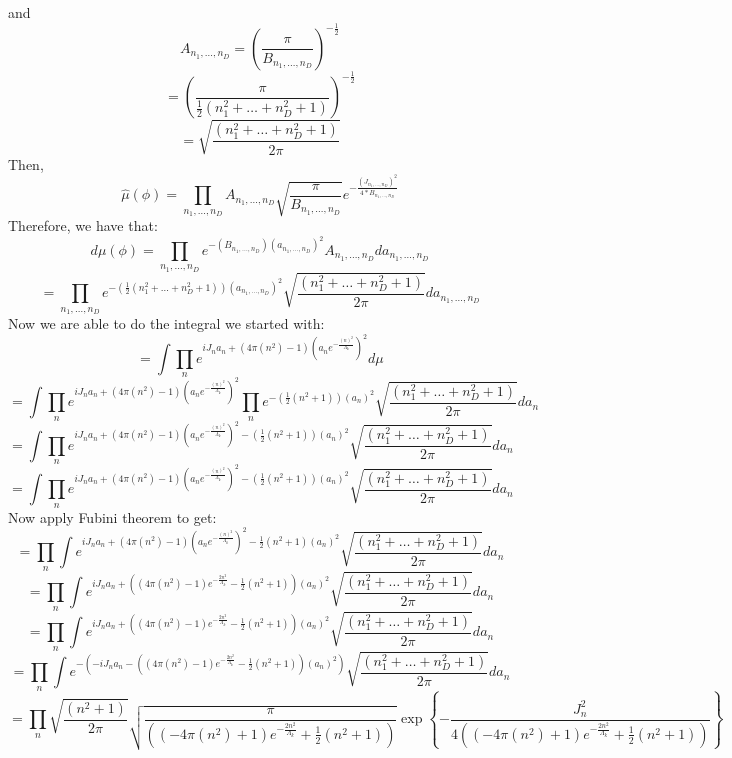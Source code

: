 \documentclass{article}
\theoremstyle{definition}
\begin{document}
and
\[
A_{n_1,\ldots,n_D} = \left(\frac{\pi} {B_{n_1,\ldots,n_D} }\right)^{-\frac{1}{2}}
\]
\[
= \left(\frac{\pi}{\frac{1}{2}\left(n_1^2+\ldots+n_D^2+1\right) }\right)^{-\frac{1}{2}}
\]
\[
= \sqrt{\frac{\left(n_1^2+\ldots+n_D^2+1\right) }{2\pi}}
\]
Then,
\[
\hat{\mu}(\phi) = \prod_{n_1,\ldots,n_D} A_{n_1,\ldots,n_D} \sqrt{\frac{\pi}{B_{n_1,\ldots,n_D} }} e^{-\frac{(J_{n_1,\ldots,n_D})^2}{4*B_{n_1,\ldots,n_D} }}
\]
Therefore, we have that:
\[
d\mu(\phi)=\prod_{n_1,\ldots,n_D}e^{-(B_{n_1,\ldots,n_D})(a_{n_1,\ldots,n_D})^2}A_{n_1,\ldots,n_D} da_{n_1,\ldots,n_D}
\]
\[
=\prod_{n_1,\ldots,n_D}e^{-(\frac{1}{2}\left(n_1^2+\ldots+n_D^2+1\right))(a_{n_1,\ldots,n_D})^2}\sqrt{\frac{\left(n_1^2+\ldots+n_D^2+1\right) }{2\pi}} da_{n_1,\ldots,n_D}
\]
Now we are able to do the integral we started with:
\[
=\int \prod_{n}e^{iJ_{n} a_{n} +
\left(4\pi(n^2)-1\right) \left(a_{n} e^{-\frac{(n)^2}{\Lambda_k}}\right)^2}d\mu
\]
\[
=\int \prod_{n}e^{iJ_{n} a_{n} +
\left(4\pi(n^2)-1\right) \left(a_{n} e^{-\frac{(n)^2}{\Lambda_k}}\right)^2}\prod_{n}e^{-(\frac{1}{2}\left(n^2+1\right))(a_{n})^2}\sqrt{\frac{\left(n_1^2+\ldots+n_D^2+1\right) }{2\pi}} da_{n}
\]
\[
=\int \prod_{n}e^{iJ_{n} a_{n} +
\left(4\pi(n^2)-1\right) \left(a_{n} e^{-\frac{(n)^2}{\Lambda_k}}\right)^2-(\frac{1}{2}\left(n^2+1\right))(a_{n})^2}\sqrt{\frac{\left(n_1^2+\ldots+n_D^2+1\right) }{2\pi}} da_{n}
\]
\[
=\int \prod_{n}e^{iJ_{n} a_{n} +
\left(4\pi(n^2)-1\right) \left(a_{n} e^{-\frac{(n)^2}{\Lambda_k}}\right)^2-(\frac{1}{2}\left(n^2+1\right))(a_{n})^2}\sqrt{\frac{\left(n_1^2+\ldots+n_D^2+1\right) }{2\pi}} da_{n}
\]
Now apply Fubini theorem to get:
\[
=\prod_{n}\int e^{iJ_{n} a_{n} +
\left(4\pi(n^2)-1\right) \left(a_{n} e^{-\frac{(n)^2}{\Lambda_k}}\right)^2-\frac{1}{2}\left(n^2+1\right)(a_{n})^2}\sqrt{\frac{\left(n_1^2+\ldots+n_D^2+1\right) }{2\pi}} da_{n}
\]
\[
=\prod_{n}\int e^{iJ_{n} a_{n} +
\left(\left(4\pi(n^2)-1\right) e^{-\frac{2n^2}{\Lambda_k}}-\frac{1}{2}\left(n^2+1\right)\right)(a_{n})^2}\sqrt{\frac{\left(n_1^2+\ldots+n_D^2+1\right) }{2\pi}} da_{n}
\]
\[
=\prod_{n}\int e^{iJ_{n} a_{n} +
\left(\left(4\pi(n^2)-1\right) e^{-\frac{2n^2}{\Lambda_k}}-\frac{1}{2}\left(n^2+1\right)\right)(a_{n})^2}\sqrt{\frac{\left(n_1^2+\ldots+n_D^2+1\right) }{2\pi}} da_{n}
\]
\[
=\prod_{n}\int e^{-(-iJ_{n} a_{n} -
\left(\left(4\pi(n^2)-1\right) e^{-\frac{2n^2}{\Lambda_k}}-\frac{1}{2}\left(n^2+1\right)\right)(a_{n})^2)}\sqrt{\frac{\left(n_1^2+\ldots+n_D^2+1\right) }{2\pi}} da_{n}
\]
\[
=\prod_{n}\sqrt{\frac{\left(n^2+1\right) }{2\pi}} \sqrt{\frac{\pi}{\left(\left(-4\pi(n^2)+1\right) e^{-\frac{2n^2}{\Lambda_k}}+\frac{1}{2}\left(n^2+1\right)\right)}}\exp\left\{-\frac{J_n^2}{4\left(\left(-4\pi(n^2)+1\right) e^{-\frac{2n^2}{\Lambda_k}}+\frac{1}{2}\left(n^2+1\right)\right)}\right\}
\]
\end{document}

